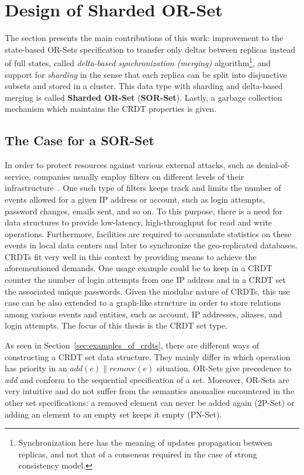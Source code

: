 \chapter{Design of Sharded OR-Set}
\label{ch:design_of_sharded_or-set}

The section presents the main contributions of this work: improvement to the
state-based OR-Sets specification to transfer only deltas between replicas
instead of full states, called \textit{delta-based synchronization (merging)}
algorithm\footnote{Synchronization here has the meaning of updates propagation
between replicas, and not that of a consensus required in the case of strong
consistency model.}, and support for \textit{sharding} in the sense that each
replica can be split into disjunctive subsets and stored in a cluster. This data
type with sharding and delta-based merging is called \textbf{Sharded OR-Set}
(\textbf{SOR-Set}). Lastly, a garbage collection mechanism which maintains the
CRDT properties is given.

\section{The Case for a SOR-Set}
\label{sec:the_case_for_a_sor-set}

In order to protect resources against various external attacks, such as
denial-of-service, companies usually employ filters on different levels of their
infrastructure~\cite{Loukas19082009}. One such type of filters keeps track and
limits the number of events allowed for a given IP address or account, such as
login attempts, password changes, emails sent, and so on. To this purpose, there
is a need for data structures to provide low-latency, high-throughput for read
and write operations. Furthermore, facilities are required to accumulate
statistics on these events in local data centers and later to synchronize the
geo-replicated databases. CRDTs fit very well in this context by providing means
to achieve the aforementioned demands. One usage example could be to keep in a
CRDT counter the number of login attempts from one IP address and in a CRDT set
the associated unique passwords. Given the modular nature of CRDTs, this
use case can be also extended to a graph-like structure in order to store
relations among various events and entities, such as account, IP addresses,
aliases, and login attempts. The focus of this thesis is the CRDT set type.

As seen in Section~\ref{sec:examples_of_crdts}, there are different ways of
constructing a CRDT set data structure. They mainly differ in which operation
has priority in an $\textit{add}(e) \parallel \textit{remove}(e)$ situation.
OR-Sets give precedence to \textit{add} and conform to the sequential
specification of a set. Moreover, OR-Sets are very intuitive and do not suffer
from the semantics anomalies encountered in the other set specifications: a
removed element can never be added again (2P-Set) or adding an element to an
empty set keeps it empty (PN-Set).


